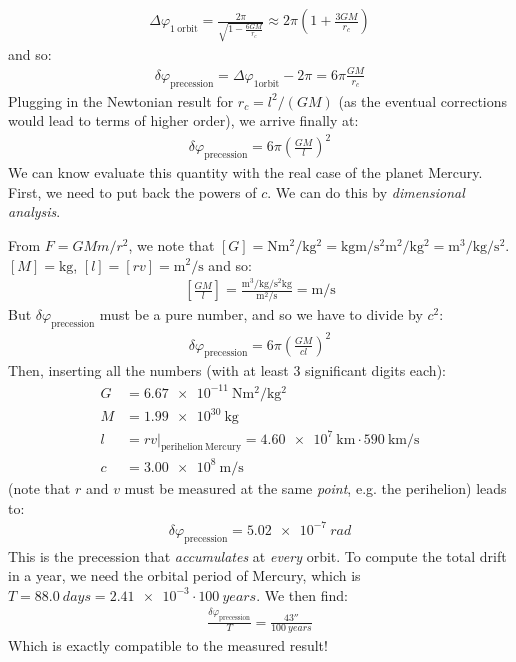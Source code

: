 \documentclass[../template.tex]{subfiles}
\begin{document}
\begin{align*}
    \Delta \varphi_{\mathrm{1\ orbit}} = \frac{2 \pi}{\displaystyle \sqrt{1 - \frac{6GM}{r_c} }} \approx 2 \pi \left(1+\frac{3 GM}{r_c} \right)
\end{align*}   
and so:
\begin{align*}
    \delta \varphi_{\mathrm{precession} } = \Delta \varphi_{\mathrm{1 orbit}} - 2 \pi = 6 \pi \frac{GM}{r_c} 
\end{align*}        
Plugging in the Newtonian result for $r_c = l^2/(GM)$ (as the eventual corrections would lead to terms of higher order), we arrive finally at:
\begin{align*}
    \delta \varphi_{\mathrm{precession} } = 6 \pi \left(\frac{GM}{l} \right)^2
\end{align*} 
We can know evaluate this quantity with the real case of the planet Mercury. First, we need to put back the powers of $c$. We can do this by \textit{dimensional analysis}. 

From $F = G Mm/r^2$, we note that $[G] = \si{\newton \m\squared \per \kilo\gram\squared} = \si{\kilo\gram \m \per \second\squared \m \squared \per \kilo\gram \squared} = \si{\m\cubed \per \kilo\gram \per \s\squared}$. $[M] = \si{\kilo\g}$, $[l] = [r v] = \si{\m\squared\per\s}$ and so:
\begin{align*}
    \left[\frac{GM}{l} \right] = \frac{\si{\m\cubed \per \kilo\g \per \s\squared \kilo\g}}{\si{\m\squared \per \s}} = \si{\m\per\s} 
\end{align*}  
But $\delta\varphi_{\mathrm{precession}}$ must be a pure number, and so we have to divide by $c^2$:
\begin{align*}
    \delta \varphi_{\mathrm{precession} } = 6 \pi \left(\frac{GM}{c l} \right)^2
\end{align*}  
Then, inserting all the numbers (with at least $3$ significant digits each):
\begin{align*}
    G &= \SI{6.67e-11}{\newton\m\squared\per \kilo\gram\squared}\\
    M &= \SI{1.99e30}{\kilo\g}\\
    l &= r v \Big|_{\mathrm{perihelion\ Mercury}} = \SI{4.60e7}{\kilo\m} \cdot \SI{590}{\kilo\m\per\s}\\
    c &= \SI{3.00e8}{\m\per\s}
\end{align*}
(note that $r$ and $v$ must be measured at the same \textit{point}, e.g. the perihelion)
leads to:
\begin{align*}
    \delta\varphi_{\mathrm{precession}} = \SI{5.02 e-7}{rad}
\end{align*}
This is the precession that \textit{accumulates} at \textit{every} orbit. To compute the total drift in a year, we need the orbital period of Mercury, which is $T = \SI{88.0}{days} = \num{2.41e-3} \cdot \SI{100}{years}$. We then find:
\begin{align*}
   \frac{\delta \varphi_{\mathrm{precession} }}{T} = \frac{43''}{\SI{100}{years}} 
\end{align*}
Which is exactly compatible to the measured result!   
\end{document}

